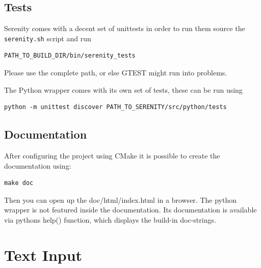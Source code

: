 \documentclass[bibliography=totocnumbered,a4paper,10pt,oneside]{scrbook}
\begin{document}
\section{Tests}
Serenity comes with a decent set of unittests in order to run them source
the \texttt{serenity.sh} script and run
\begin{lstlisting}
PATH_TO_BUILD_DIR/bin/serenity_tests
\end{lstlisting}
Please use the complete path, or else GTEST might run into problems.

The Python wrapper comes with its own set of tests, these can be run using
\begin{lstlisting}
python -m unittest discover PATH_TO_SERENITY/src/python/tests
\end{lstlisting}
\section{Documentation}
After configuring the project using CMake it is possible to create the documentation
using:
\begin{lstlisting}
make doc
\end{lstlisting}
Then you can open up the doc/html/index.html in a browser.
The python wrapper is not featured inside the documentation.
Its documentation is available via pythons help() function,
which displays the build-in doc-strings.

\clearpage
\chapter{Text Input}
\end{document}
